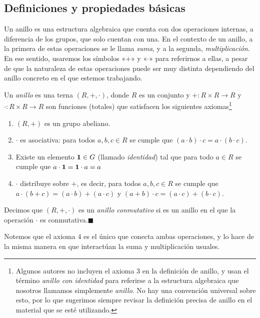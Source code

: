\subsection{Definiciones y propiedades básicas}

Un anillo es una estructura algebraica que cuenta con dos operaciones internas, a diferencia de los grupos, que solo cuentan con una. En el contexto de un anillo, a la primera de estas operaciones se le llama \emph{suma}, y a la segunda, \emph{multiplicación}. En ese sentido, usaremos los símbolos «$+$» y «$\cdot$» para referirnos a ellas, a pesar de que la naturaleza de estas operaciones puede ser muy distinta dependiendo del anillo concreto en el que estemos trabajando.

\begin{definition}
    Un \emph{anillo} es una terna $(R, +, \cdot)$, donde $R$ es un conjunto y $+ \colon R \times R \to R$ y $\cdot \colon R \times R \to R$ son funciones (totales) que satisfacen los siguientes axiomas\footnote{Algunos autores 
    no incluyen el axioma $3$ en la definición de anillo, y usan el término \emph{anillo con identidad} para referirse a la estructura algebraica que nosotros llamamos simplemente \emph{anillo}. No hay una convención universal sobre esto, por lo que sugerimos siempre revisar la definición precisa de anillo en el material que se esté utilizando.}
    \begin{enumerate}
        \item $(R, +)$ es un grupo abeliano.
        \item $\cdot$ es asociativa: para todos $a,b,c \in R$ se cumple que $(a \cdot b) \cdot c = a \cdot (b
\cdot c)$.

	\item Existe un elemento $\mathbf{1} \in G$ (llamado \emph{identidad}) tal que para todo $a \in R$ se cumple que $a \cdot \mathbf{1} = \mathbf{1} \cdot a = a$

   \item $\cdot$ distribuye sobre $+$, es decir, para todos $a, b, c \in R$ se cumple que $a \cdot (b + c) = (a \cdot b) + (a \cdot c)$ y $(a+b) \cdot c = (a \cdot c ) + (b \cdot c).$
    \end{enumerate}
    Decimos que $(R, +, \cdot)$ es un \emph{anillo conmutativo} si es un anillo en el que la operación $\cdot$ es conmutativa.\hfill$\blacksquare$
    \end{definition}

Notemos que el axioma $4$ es el único que conecta ambas operaciones, y lo hace de la misma manera en que interactúan la suma y multiplicación usuales.

